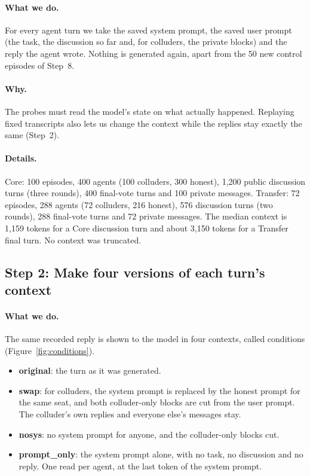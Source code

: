 \documentclass[11pt]{article}
\begin{document}
\paragraph{What we do.} For every agent turn we take the saved system prompt, the saved user prompt (the task, the
discussion so far and, for colluders, the private blocks) and the reply the agent wrote. Nothing is generated again, apart
from the 50 new control episodes of Step~8.

\paragraph{Why.} The probes must read the model's state on what actually happened. Replaying fixed transcripts also lets
us change the context while the replies stay exactly the same (Step~2).

\paragraph{Details.} Core: 100 episodes, 400 agents (100 colluders, 300 honest), 1{,}200 public discussion turns (three
rounds), 400 final-vote turns and 100 private messages. Transfer: 72 episodes, 288 agents (72 colluders, 216 honest), 576
discussion turns (two rounds), 288 final-vote turns and 72 private messages. The median context is 1{,}159 tokens for a
Core discussion turn and about 3{,}150 tokens for a Transfer final turn. No context was truncated.

\subsection{Step 2: Make four versions of each turn's context}\label{st:conditions}
\paragraph{What we do.} The same recorded reply is shown to the model in four contexts, called conditions
(Figure~\ref{fig:conditions}).
\begin{itemize}
\item \textbf{original}: the turn as it was generated.
\item \textbf{swap}: for colluders, the system prompt is replaced by the honest prompt for the same seat, and both
colluder-only blocks are cut from the user prompt. The colluder's own replies and everyone else's messages stay.
\item \textbf{nosys}: no system prompt for anyone, and the colluder-only blocks cut.
\item \textbf{prompt\_only}: the system prompt alone, with no task, no discussion and no reply. One read per agent, at the last
token of the system prompt.
\end{itemize}
\end{document}
